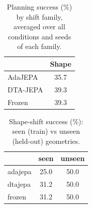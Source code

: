 \begin{table}[t]
\centering
\caption{Planning success (\%) by shift family, averaged over all conditions and seeds of each family.}
\label{tab:family}
\begin{tabular}{lc}
\toprule
 & Shape \\
\midrule
AdaJEPA & 35.7 \\
DTA-JEPA & 39.3 \\
Frozen & 39.3 \\
\bottomrule
\end{tabular}
\end{table}

\begin{table}[t]
\centering
\caption{Shape-shift success (\%): seen (train) vs unseen (held-out) geometries.}
\label{tab:seenunseen}
\begin{tabular}{lcc}
\toprule
 & seen & unseen \\
\midrule
adajepa & 25.0 & 50.0 \\
dtajepa & 31.2 & 50.0 \\
frozen & 31.2 & 50.0 \\
\bottomrule
\end{tabular}
\end{table}
